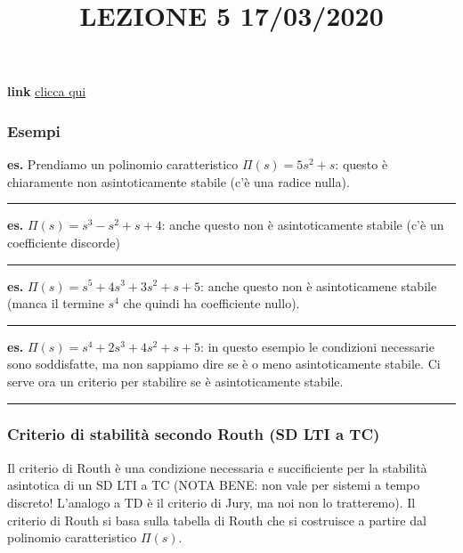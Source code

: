 \title{LEZIONE 5 17/03/2020}\newline
\textbf{link} \href{https://web.microsoftstream.com/video/72b5f396-c34b-4ff6-8d6e-44bf6832dd2e?list=user&userId=faa91214-a6f5-40d7-8875-253fd49b8ce1}{clicca qui}
\subsubsection*{Esempi}
\textbf{es.} Prendiamo un polinomio caratteristico $\Pi(s) = 5 s^2 +s$: questo è chiaramente non asintoticamente stabile (c'è una radice nulla).\newline
\rule{\textwidth}{0,4pt}\newline
\newline
\textbf{es.} $\Pi(s) = s^3 -s^2 +s +4$: anche questo non è asintoticamente stabile (c'è un coefficiente discorde)\newline
\rule{\textwidth}{0,4pt}\newline
\newline
\textbf{es.} $\Pi(s) = s^5 +4 s^3 +3s^2 +s + 5$: anche questo non è asintoticamene stabile (manca il termine $s^4$ che quindi ha coefficiente nullo).\newline
\rule{\textwidth}{0,4pt}\newline
\newline
\textbf{es.} $\Pi(s) = s^4 +2s^3+4s^2+s+5$: in questo esempio le condizioni necessarie sono soddisfatte, ma non sappiamo dire se è o meno asintoticamente stabile. Ci serve ora un criterio per stabilire se è asintoticamente stabile.\newline
\rule{\textwidth}{0,4pt}
\subsubsection{Criterio di stabilità secondo Routh (SD LTI a TC)}
Il criterio di Routh è una condizione necessaria e succificiente per la stabilità asintotica di un SD LTI a TC (NOTA BENE: non vale per sistemi a tempo discreto! L'analogo a TD è il criterio di Jury, ma noi non lo tratteremo).\newline
\newline
Il criterio di Routh si basa sulla tabella di Routh che si costruisce a partire dal polinomio caratteristico $\Pi(s)$.
